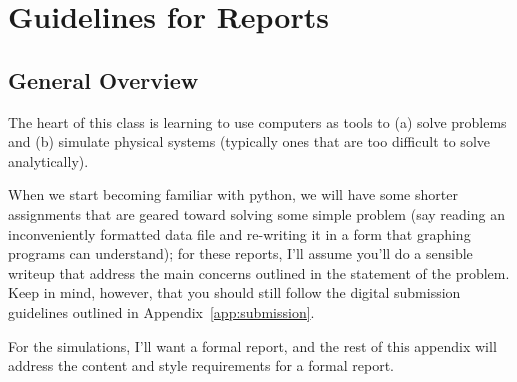 \chapter{Guidelines for Reports}
\label{app:guidelines} %

\section{General Overview}\label{sec:GeneralOverview}

The heart of this class is learning to use computers as tools to (a) solve problems and (b) simulate physical systems (typically ones that are too difficult to solve analytically). 

When we start becoming familiar with python, we will have some shorter assignments that are geared toward solving some simple problem (say reading an inconveniently formatted data file and re-writing it in a form that graphing programs can understand); for these reports, I'll assume you'll do a sensible writeup that address the main concerns outlined in the statement of the problem. Keep in mind, however, that you should still follow the digital submission guidelines outlined in Appendix~\ref{app:submission}. 

For the simulations, I'll want a formal report, and the rest of this appendix will address the content and style requirements for a formal report. 

